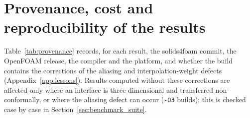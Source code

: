\section{Provenance, cost and reproducibility of the results}
\label{app:provenance}

Table~\ref{tab:provenance} records, for each result, the solids4foam commit, the OpenFOAM release, the compiler and the platform, and whether the build contains the corrections of the aliasing and interpolation-weight defects (Appendix~\ref{app:lessons}).
Results computed without these corrections are affected only where an interface is three-dimensional and transferred non-conformally, or where the aliasing defect can occur (\texttt{-O3} builds); this is checked case by case in Section~\ref{sec:benchmark_suite}.

